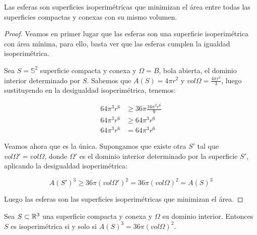 \begin{proposition}
Las esferas son superficies isoperimétricas que minimizan el área entre todas las superficies compactas y conexas con su mismo volumen.
\end{proposition}
\begin{proof}
Veamos en primer lugar que las esferas son una superficie isoperimétrica con área mínima, para ello, basta ver que las esferas cumplen la igualdad isoperimétrica.

Sea $S=\mathbb{S}^2$ superficie compacta y conexa y $\Omega = B$, bola abierta, el dominio interior determinado por $S$. Sabemos que $A(S)=4\pi r^2$ y $vol \Omega = \frac{4\pi r^3}{3}$, luego sustituyendo en la desigualdad isoperimétrica, tenemos:

\begin{align*}
    64 \pi^3 r^6 &\geq 36\pi \frac{16\pi^2r^6}{9} \\
    64 \pi^3 r^6 &\geq 64\pi^3r^6 \\
    64 \pi^3 r^6 &= 64\pi^3r^6
\end{align*}

Veamos ahora que es la única. Supongamos que existe otra $S'$ tal que $vol \Omega' = vol \Omega$, donde $\Omega'$ es el dominio interior determinado por la superficie $S'$, aplicando la desigualdad isoperimétrica:

\begin{equation*}
    A(S')^3 \geq 36\pi (vol \Omega')^2 = 36\pi (vol \Omega)^2 = A(S)^3
\end{equation*}

Luego las esferas son las superficies isoperimétricas que minimizan el área.
\end{proof}

\begin{corolario}
Sea $S \subset \mathbb{R}^3$ una superficie compacta y conexa y $\Omega$ su dominio interior. Entonces $S$ es isoperimétrica si y solo si $A(S)^3 = 36\pi (vol \Omega)^2$.
\end{corolario}
